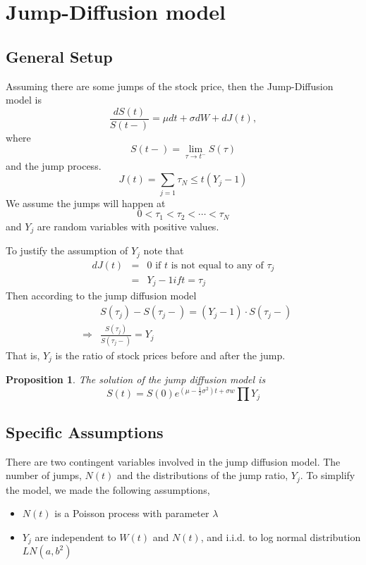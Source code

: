 \documentclass[12pt]{amsart}
\newtheorem{prop}[theorem]{Proposition}
\theoremstyle{definition}
\theoremstyle{remark}
\begin{document}
\section{Jump-Diffusion  model}
\subsection{General Setup}
Assuming there are some jumps of the stock price, then the Jump-Diffusion model is 
\begin{equation*}
\frac{dS(t)}{S(t-)} = \mu dt +\sigma dW+dJ(t),
\end{equation*}
where 
\begin{equation*}
S(t-) = \lim _{\tau \rightarrow t^-}S(\tau)
\end{equation*}
and   the jump process.
\begin{equation*}
J(t) = \sum_{j=1}{\tau_N \le t}(Y_j-1)
\end{equation*}
We assume the jumps will happen at 
\begin{equation*}
0< \tau_1<\tau_2<\cdots<\tau_N
\end{equation*}
and $Y_j$ are random variables with positive values.

To justify the assumption of $Y_j$ note that
\begin{eqnarray*}
dJ(t) &=& 0 \mbox{  if }  t  \mbox{ is not equal to any of } \tau_j\\
&=& Y_j-1 if t = \tau_j 
\end{eqnarray*}
Then according to the jump diffusion model 
\begin{eqnarray*}
&& S(\tau_j)-S(\tau_j-)=  (Y_j-1)\cdot S(\tau_j-)\\
&\Rightarrow& \frac{S(\tau_j)}{S(\tau_j-)} = Y_j
\end{eqnarray*}
That is, $Y_j$ is the ratio of stock prices before and after the jump.

\begin{prop}
The solution of the jump diffusion model is 
\begin{equation*}
S(t) = S(0)e^{(\mu - \frac{1}{2}\sigma ^2)t +\sigma w  }\prod Y_j
\end{equation*}
\end{prop}

\subsection{Specific Assumptions}
There are two contingent variables involved in the jump diffusion model. The number of jumps,  $N(t)$ and the distributions of the jump ratio, $Y_j$.
To simplify the model, we made the following assumptions,
\begin{itemize}
\item $N(t)$ is a Poisson process with parameter $\lambda$
\item $Y_j$ are independent to $W(t)$ and $N(t)$,  and i.i.d. to log normal distribution $LN(a, b^2)$
\end{itemize}
\end{document}
